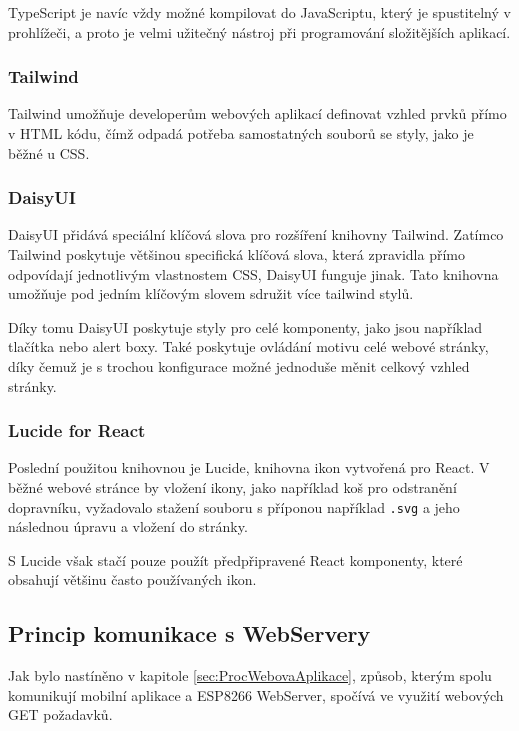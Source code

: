 TypeScript je navíc vždy možné kompilovat do JavaScriptu, který je spustitelný v prohlížeči, a proto je velmi užitečný nástroj při programování složitějších aplikací.
\cite{TSweb}

\subsubsection{Tailwind}
Tailwind umožňuje developerům webových aplikací definovat vzhled prvků přímo v HTML kódu, čímž odpadá potřeba samostatných souborů se styly, jako je běžné u CSS.
\cite{Tailwindweb}

\subsubsection{DaisyUI}\label{sec:DaisyUI}
DaisyUI přidává speciální klíčová slova pro rozšíření knihovny Tailwind. Zatímco Tailwind poskytuje většinou specifická klíčová slova, která zpravidla přímo odpovídají jednotlivým vlastnostem CSS, DaisyUI funguje jinak. Tato knihovna umožňuje pod jedním klíčovým slovem sdružit více tailwind stylů.
\cite{daisyuiweb}

Díky tomu DaisyUI poskytuje styly pro celé komponenty, jako jsou například tlačítka nebo alert boxy. Také poskytuje ovládání motivu celé webové stránky, díky čemuž je s trochou konfigurace možné jednoduše měnit celkový vzhled stránky.

\subsubsection{Lucide for React}
Poslední použitou knihovnou je Lucide, knihovna ikon vytvořená pro React. V běžné webové stránce by vložení ikony, jako například koš pro odstranění dopravníku, vyžadovalo stažení souboru s příponou například \texttt{.svg} a jeho následnou úpravu a vložení do stránky.

S Lucide však stačí pouze použít předpřipravené React komponenty, které obsahují většinu často používaných ikon.
\cite{lucideWeb}

\subsection{Princip komunikace s WebServery}\label{sec:PrincipKomunikaceSeServery}

Jak bylo nastíněno v kapitole \ref{sec:ProcWebovaAplikace}, způsob, kterým spolu komunikují mobilní aplikace a ESP8266 WebServer, spočívá ve využití webových GET požadavků.

